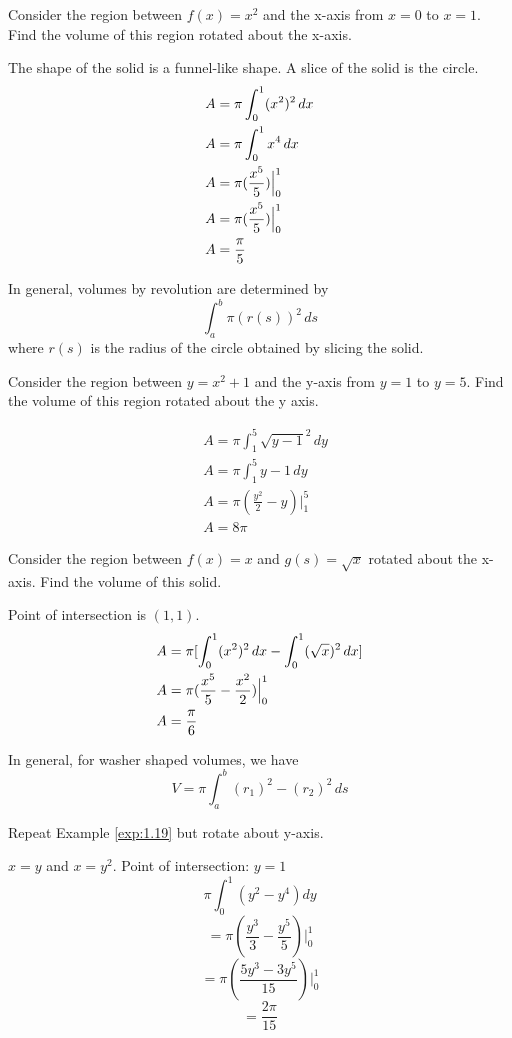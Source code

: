 \documentclass[english, 12pt]{article}
\begin{document}
\begin{exmp}
Consider the region between $f(x) = x^2$ and the x-axis from $x=0$ to $x=1$. Find the volume of this region rotated about the x-axis.
\begin{sol}
The shape of the solid is a funnel-like shape. A slice of the solid is the circle.
\begin{align*}
& A=\pi \int_0^1 (x^2)^2\,dx \\
& A=\pi \int_0^1 x^4\,dx \\
& A= \pi (\frac{x^5}{5})\Big|_0^1\\
& A= \pi (\frac{x^5}{5})\Big|_0^1\\
& A= \frac{\pi}{5}
\end{align*}
\end{sol}
\end{exmp}
In general, volumes by revolution are determined by \[ \int_a^b \pi (r(s))^2\,ds \]
where $r(s)$ is the radius of the circle obtained by slicing the solid.
\begin{exmp}
Consider the region between $y=x^2+1$ and the y-axis from $y=1$ to $y=5$. Find the volume of this region rotated about the y axis.
\begin{sol}
\begin{align*}
& A= \pi \int_1^5 \sqrt{y-1}^2\,dy \\
& A = \pi \int_1^5 y-1\,dy \\
& A = \pi (\frac{y^2}{2} - y)\Big|_1^5\\
& A = 8 \pi
\end{align*}
\end{sol}
\end{exmp}
\begin{exmp}\label{exp:1.19}
Consider the region between $f(x)=x$ and $g(s)=\sqrt x$ rotated about the x-axis. Find the volume of this solid.
\begin{sol}
Point of intersection is $(1,1)$.
\begin{align*}
& A = \pi[\int_0^1  (x^2)^2\,dx - \int_0^1 (\sqrt x)^2\,dx]\\
& A = \pi (\frac{x^5}{5} - \frac{x^2}{2})\Big|_{0}^{1}\\
& A = \frac{\pi}{6}
\end{align*}
\end{sol}
\end{exmp}

In general, for washer shaped volumes, we have \\
\[ V = \pi \int_a^b  (r_{1})^2 - (r_{2})^2\,ds\]
\begin{exercise}
Repeat Example \ref{exp:1.19} but rotate about y-axis.
\begin{sol}
$x=y$ and $x=y^2$. Point of intersection: $ y=1$
\[ \pi \int_0^1 (y^2 - y^4) dy \]
\[ =\pi (\frac{y^3}{3} - \frac{y^5}{5})\Big|_0^1 \] 
\[ =\pi (\frac{5y^3-3y^5}{15})\Big|_0^1 \] 
\[ =\frac{2 \pi}{15} \]
\end{sol}
\end{exercise}
\end{document}
